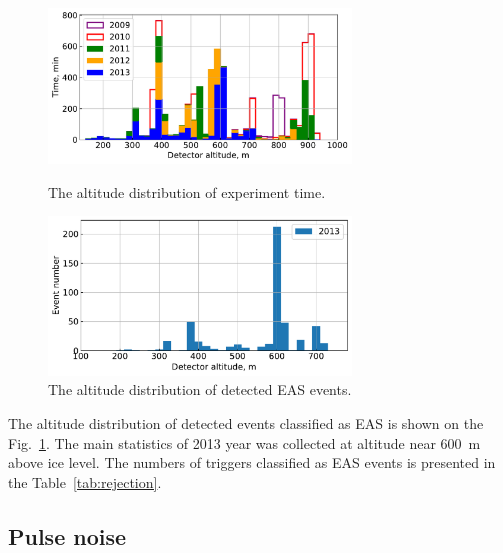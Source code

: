 \documentclass[final,5p,times,twocolumn]{elsarticle}
\begin{document}
\begin{figure}[t]
    \includegraphics[width=19pc]{figs/time_on_altitude.pdf}%
    \caption{The altitude distribution of experiment time.}
    \label{fig:time_on_altitude}
\vspace{2pc}
    \includegraphics[width=19pc]{figs/height_eas.pdf}
    \caption{The altitude distribution of detected EAS events.}
    \label{fig:height_eas}
\end{figure}


The altitude distribution of detected events classified as EAS is shown on the Fig.~\ref{fig:height_eas}. The main statistics of 2013 year was collected at altitude near 600~m above ice level. The numbers of triggers classified as EAS events is presented in the Table~\ref{tab:rejection}.




\subsection{Pulse noise}
\label{sect:noiseremoval}
\end{document}
